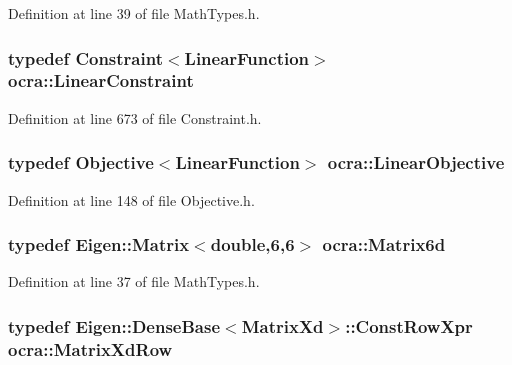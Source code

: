 Definition at line 39 of file Math\+Types.\+h.

\subsubsection[{\texorpdfstring{Linear\+Constraint}{LinearConstraint}}]{\setlength{\rightskip}{0pt plus 5cm}typedef {\bf Constraint}$<${\bf Linear\+Function}$>$ {\bf ocra\+::\+Linear\+Constraint}}\hypertarget{namespaceocra_ae8b87cf4099be3efc3b410019ad2046e}{}\label{namespaceocra_ae8b87cf4099be3efc3b410019ad2046e}


Definition at line 673 of file Constraint.\+h.

\subsubsection[{\texorpdfstring{Linear\+Objective}{LinearObjective}}]{\setlength{\rightskip}{0pt plus 5cm}typedef {\bf Objective}$<${\bf Linear\+Function}$>$ {\bf ocra\+::\+Linear\+Objective}}\hypertarget{namespaceocra_a1dc9b2b863ed7542eb48b66c2fe5793a}{}\label{namespaceocra_a1dc9b2b863ed7542eb48b66c2fe5793a}


Definition at line 148 of file Objective.\+h.

\subsubsection[{\texorpdfstring{Matrix6d}{Matrix6d}}]{\setlength{\rightskip}{0pt plus 5cm}typedef Eigen\+::\+Matrix$<$double,6,6$>$ {\bf ocra\+::\+Matrix6d}}\hypertarget{namespaceocra_a4ee053c9fed8722df857e4f8f4d6d334}{}\label{namespaceocra_a4ee053c9fed8722df857e4f8f4d6d334}


Definition at line 37 of file Math\+Types.\+h.

\subsubsection[{\texorpdfstring{Matrix\+Xd\+Row}{MatrixXdRow}}]{\setlength{\rightskip}{0pt plus 5cm}typedef Eigen\+::\+Dense\+Base$<$Matrix\+Xd$>$\+::Const\+Row\+Xpr {\bf ocra\+::\+Matrix\+Xd\+Row}}\hypertarget{namespaceocra_a608bf0522317ed1df3bbfc6a5753bc01}{}\label{namespaceocra_a608bf0522317ed1df3bbfc6a5753bc01}


